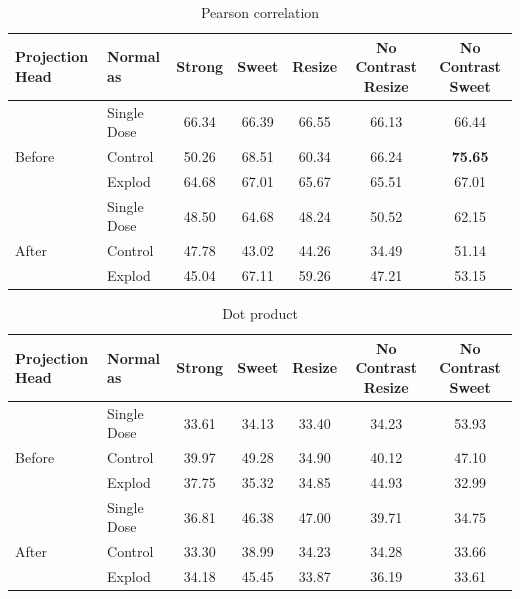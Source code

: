 \begin{table}[H]
  \centering
  \begin{tabular}{@{}llccccc@{}}
  \toprule
  Projection Head & Normal as       & Strong & Sweet & Resize & No Contrast Resize & No Contrast Sweet \\ \midrule
                  & Single Dose    & 66.34      & 66.39     & 66.55      & 66.13                  & 66.44                 \\
  Before          & Control        & 50.26      & 68.51     & 60.34      & 66.24                  & \textbf{75.65}                 \\
                  & Explod         & 64.68      & 67.01     & 65.67      & 65.51                  & 67.01                 \\ \midrule
                  & Single Dose    & 48.50      & 64.68     & 48.24      & 50.52                  & 62.15                 \\
  After           & Control        & 47.78      & 43.02     & 44.26      & 34.49                  & 51.14                 \\
                  & Explod         & 45.04      & 67.11     & 59.26      & 47.21                  & 53.15                 \\ \bottomrule
  \end{tabular}
  \caption{Pearson correlation}
  \label{tab:table_label}
\end{table}


\begin{table}[H]
  \centering
  \begin{tabular}{@{}llccccc@{}}
  \toprule
  Projection Head & Normal as       & Strong & Sweet & Resize & No Contrast Resize & No Contrast Sweet \\ \midrule
                  & Single Dose    & 33.61      & 34.13     & 33.40      & 34.23                  & 53.93                 \\
  Before          & Control        & 39.97      & 49.28     & 34.90      & 40.12                  & 47.10                 \\
                  & Explod         & 37.75      & 35.32     & 34.85      & 44.93                  & 32.99                 \\ \midrule
                  & Single Dose    & 36.81      & 46.38     & 47.00      & 39.71                  & 34.75                 \\
  After           & Control        & 33.30      & 38.99     & 34.23      & 34.28                  & 33.66                 \\
                  & Explod         & 34.18      & 45.45     & 33.87      & 36.19                  & 33.61                 \\ \bottomrule
  \end{tabular}
  \caption{Dot product}
  \label{tab:table_label}
\end{table}

